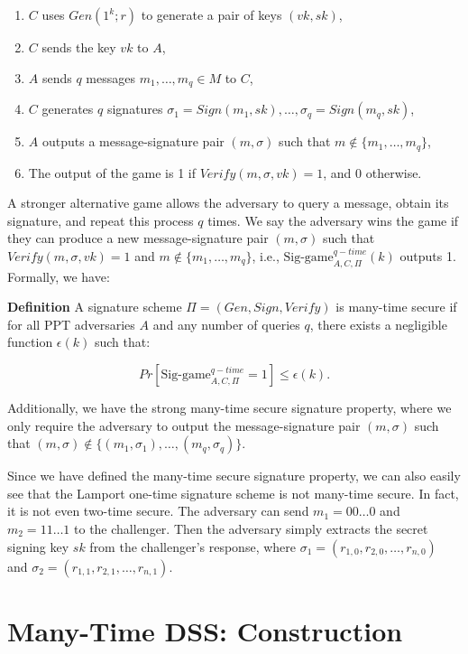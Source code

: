 \begin{enumerate}
    \item $C$ uses $Gen(1^k; r)$ to generate a pair of keys $(vk, sk)$,
    \item $C$ sends the key $vk$ to $A$,
    \item $A$ sends $q$ messages $m_1, \dots, m_q \in M$ to $C$,
    \item $C$ generates $q$ signatures $\sigma_1 = Sign(m_1, sk), \dots, \sigma_q = Sign(m_q, sk)$,
    \item $A$ outputs a message-signature pair $(m, \sigma)$ such that $m \notin \{m_1, \dots, m_q\}$,
    \item The output of the game is 1 if $Verify(m, \sigma, vk) = 1$, and 0 otherwise.
\end{enumerate}

A stronger alternative game allows the adversary to query a message, obtain its signature, and repeat this process $q$ times. We say the adversary wins the game if they can produce a new message-signature pair $(m, \sigma)$ such that $Verify(m, \sigma, vk) = 1$ and $m \notin \{m_1, \dots, m_q\}$, i.e., $\text{Sig-game}^{q-time}_{A,C,\Pi} (k)$ outputs 1. Formally, we have:

\textbf{Definition} A signature scheme $\Pi = (Gen, Sign, Verify)$ is many-time secure if for all PPT adversaries $A$ and any number of queries $q$, there exists a negligible function $\epsilon(k)$ such that:

\[
Pr[\text{Sig-game}^{q-time}_{A,C,\Pi} = 1] \leq \epsilon(k).
\]

Additionally, we have the strong many-time secure signature property, where we only require the adversary to output the message-signature pair $(m, \sigma)$ such that $(m, \sigma) \notin \{(m_1, \sigma_1), \dots, (m_q, \sigma_q)\}$. 

Since we have defined the many-time secure signature property, we can also easily see that the Lamport one-time signature scheme is not many-time secure. In fact, it is not even two-time secure. The adversary can send $m_1 = 00\dots0$ and $m_2 = 11\dots1$ to the challenger. Then the adversary simply extracts the secret signing key $sk$ from the challenger's response, where $\sigma_1 = (r_{1,0}, r_{2,0}, \dots, r_{n,0})$ and $\sigma_2 = (r_{1,1}, r_{2,1}, \dots, r_{n,1})$.

\section{Many-Time DSS: Construction}

